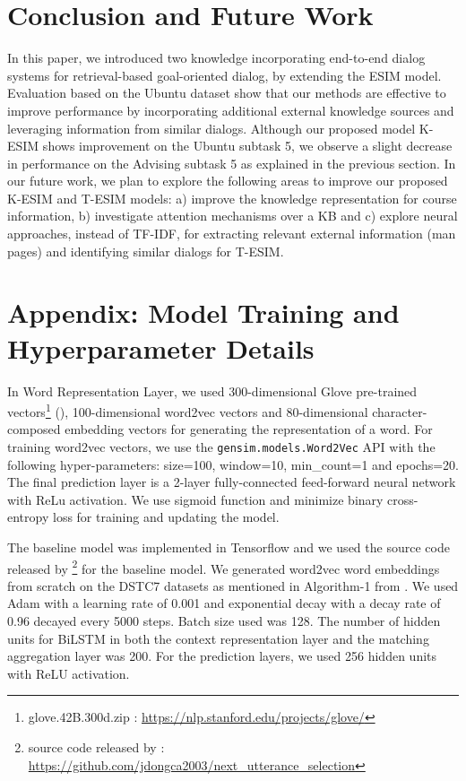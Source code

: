 \documentclass[letterpaper]{article} %
\begin{document}
\section{Conclusion and Future Work}
In this paper, we introduced two knowledge incorporating end-to-end dialog systems for retrieval-based goal-oriented dialog, by extending the ESIM model. Evaluation based on the Ubuntu dataset show that our methods are effective to improve performance by incorporating additional external knowledge sources and leveraging information from similar dialogs. Although our proposed model K-ESIM shows improvement on the Ubuntu subtask 5, we observe a slight decrease in performance on the Advising subtask 5 as explained in the previous section.  In our future work, we plan to explore the following areas to improve our proposed K-ESIM and T-ESIM models: a) improve the knowledge representation for course information, b) investigate attention mechanisms over a KB \cite{eric2017key} and c) explore neural approaches, instead of TF-IDF, for extracting relevant external information (man pages) and identifying similar dialogs for T-ESIM.

\section{Appendix: Model Training and Hyperparameter Details}
In Word Representation Layer, we used 300-dimensional Glove pre-trained vectors\footnote{glove.42B.300d.zip : \url{https://nlp.stanford.edu/projects/glove/}} (\cite{pennington2014glove}), 100-dimensional word2vec vectors \cite{mikolov2013efficient} and 80-dimensional character-composed embedding vectors for generating the representation of a word. For training word2vec vectors, we use the \texttt{gensim.models.Word2Vec} API with the following hyper-parameters: size=100, window=10, min\_count=1 and epochs=20. The final prediction layer is a 2-layer fully-connected feed-forward neural network with ReLu activation. We use sigmoid function and minimize binary cross-entropy loss for training and updating the model.

The baseline model was implemented in Tensorflow \cite{abadi2016tensorflow} and we used the source code released by \citeauthor{dong2018enhance} \footnote{source code released by \citeauthor{dong2018enhance} : \url{https://github.com/jdongca2003/next_utterance_selection}} for the baseline model. We generated word2vec word embeddings from scratch on the DSTC7 datasets as mentioned in Algorithm-1 from \citeauthor{dong2018enhance} . We used Adam \cite{kingma2014adam} with a learning rate of 0.001 and exponential decay with a decay rate of 0.96 decayed every 5000 steps. Batch size used was 128. The number of hidden units for BiLSTM in both the context representation layer and the matching aggregation layer was 200. For the prediction layers, we used 256 hidden units with ReLU activation.
\end{document}
